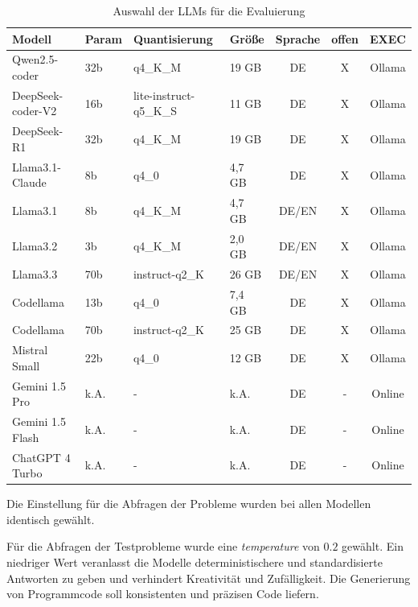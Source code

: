 \begin{table}[!ht]
	\begin{tabular}{|l|l|l|l|c|c|c|}
		\hline
		\textbf{Modell} & \textbf{Param} & \textbf{Quantisierung} & \textbf{Größe} & \textbf{Sprache} & \textbf{offen} & \textbf{EXEC} \\
		\hline
		Qwen2.5-coder     &  32b &               q4\_K\_M &  19 GB &    DE & X & Ollama \\
		DeepSeek-coder-V2 &  16b & lite-instruct-q5\_K\_S &  11 GB &    DE & X & Ollama \\
		DeepSeek-R1       &  32b &               q4\_K\_M &  19 GB &    DE & X & Ollama \\
		Llama3.1-Claude   &   8b &                  q4\_0 & 4,7 GB &    DE & X & Ollama \\
		Llama3.1          &   8b &               q4\_K\_M & 4,7 GB & DE/EN & X & Ollama \\
		Llama3.2          &   3b &               q4\_K\_M & 2,0 GB & DE/EN & X & Ollama \\
		Llama3.3          &  70b &         instruct-q2\_K &  26 GB & DE/EN & X & Ollama \\
		Codellama         &  13b &                  q4\_0 & 7,4 GB &    DE & X & Ollama \\
		Codellama         &  70b &         instruct-q2\_K &  25 GB &    DE & X & Ollama \\
		Mistral Small     &  22b &                  q4\_0 &  12 GB &    DE & X & Ollama \\
		Gemini 1.5 Pro    & k.A. &                      - &   k.A. &    DE & - & Online \\
		Gemini 1.5 Flash  & k.A. &                      - &   k.A. &    DE & - & Online \\
		ChatGPT 4 Turbo   & k.A. &                      - &   k.A. &    DE & - & Online \\
		\hline
		\hline
	\end{tabular}
	\caption{Auswahl der LLMs für die Evaluierung}
	\label{tab:selected_llms}
\end{table}

Die Einstellung für die Abfragen der Probleme wurden bei allen Modellen identisch gewählt.\vspace{0.2cm}

Für die Abfragen der Testprobleme wurde eine \textit{temperature} von $0.2$ gewählt. Ein niedriger Wert veranlasst die Modelle deterministischere und standardisierte Antworten zu geben und verhindert Kreativität und Zufälligkeit. Die Generierung von Programmcode soll konsistenten und präzisen Code liefern.\vspace{0.2cm}

